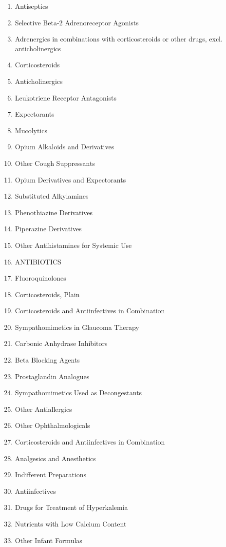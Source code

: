 \documentclass[a4paper,12pt]{article}
\begin{document}
\begin{appendices}
\begin{enumerate}
   			\item Antiseptics
   			\item Selective Beta-2 Adrenoreceptor Agonists
   			\item Adrenergics in combinations with corticosteroids or other drugs, excl. anticholinergics
   			\item Corticosteroids
   			\item Anticholinergics
   			\item Leukotriene Receptor Antagonists
   			\item Expectorants
   			\item Mucolytics
   			\item Opium Alkaloids and Derivatives
   			\item Other Cough Suppressants
   			\item Opium Derivatives and Expectorants
   			\item Substituted Alkylamines
   			\item Phenothiazine Derivatives
   			\item Piperazine Derivatives
   			\item Other Antihistamines for Systemic Use
   			\item ANTIBIOTICS
   			\item Fluoroquinolones
   			\item Corticosteroids, Plain
   			\item Corticosteroids and Antiinfectives in Combination
   			\item Sympathomimetics in Glaucoma Therapy
   			\item Carbonic Anhydrase Inhibitors
   			\item Beta Blocking Agents
   			\item Prostaglandin Analogues
   			\item Sympathomimetics Used as Decongestants
   			\item Other Antiallergics
   			\item Other Ophthalmologicals
   			\item Corticosteroids and Antiinfectives in Combination
   			\item Analgesics and Anesthetics
   			\item Indifferent Preparations
   			\item Antiinfectives
   			\item Drugs for Treatment of Hyperkalemia
   			\item Nutrients with Low Calcium Content
   			\item Other Infant Formulas

\end{enumerate}
\end{appendices}
\end{document}
